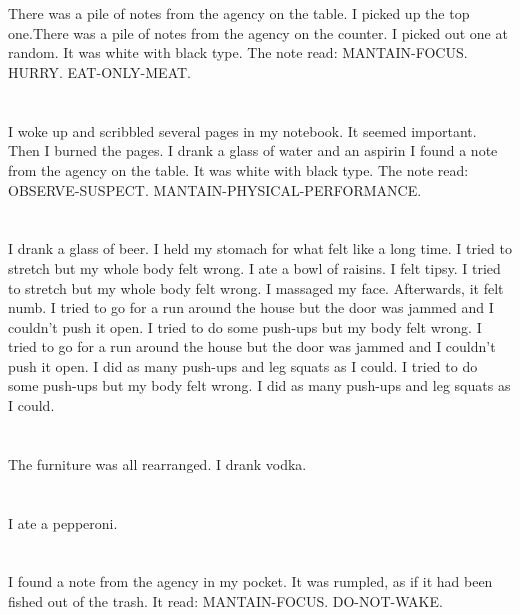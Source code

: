 \documentclass{article}
\begin{document}
    \section{}
    There was a pile of notes from the agency on the table. I picked up the top one.There was a pile of notes from the agency on the counter. I picked out one at random. It was white with black type. The note read: MANTAIN-FOCUS. HURRY. EAT-ONLY-MEAT.  
    \newpage
    
    \section{}
    I woke up and scribbled several pages in my notebook. It seemed important. Then I burned the pages. I drank a glass of water and an aspirin I found a note from the agency on the table. It was white with black type. The note read: OBSERVE-SUSPECT. MANTAIN-PHYSICAL-PERFORMANCE.  
    \newpage
    
    \section{}
    I drank a glass of beer. I held my stomach for what felt like a long time. I tried to stretch but my whole body felt wrong. I ate a bowl of raisins. I felt tipsy.  I tried to stretch but my whole body felt wrong.  I massaged my face. Afterwards, it felt numb.  I tried to go for a run around the house but the door was jammed and I couldn't push it open.  I tried to do some push-ups but my body felt wrong.   I tried to go for a run around the house but the door was jammed and I couldn't push it open.  I did as many push-ups and leg squats as I could.  I tried to do some push-ups but my body felt wrong.  I did as many push-ups and leg squats as I could.  
    \newpage
    
    \section{}
    The furniture was all rearranged. I drank vodka.  
    \newpage
    
    \section{}
    I ate a pepperoni.  
    \newpage
    
    \section{}
    I found a note from the agency in my pocket. It was rumpled, as if it had been fished out of the trash. It read: MANTAIN-FOCUS. DO-NOT-WAKE.  
    \newpage
    
\end{document}
